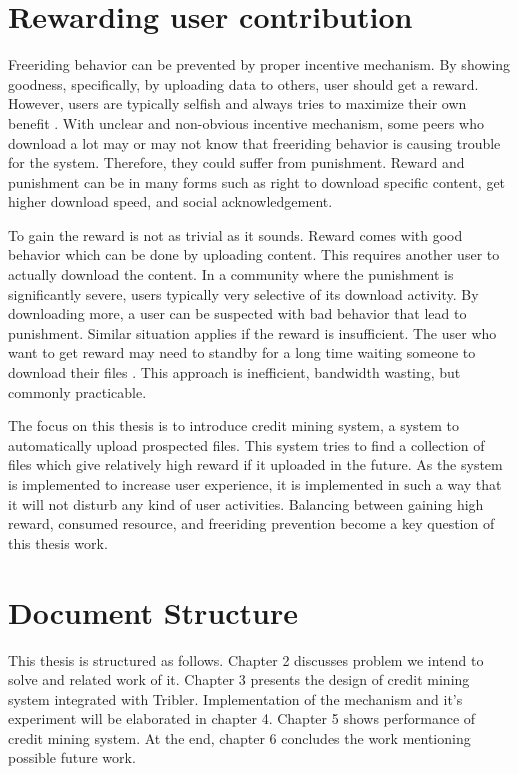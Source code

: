 \section{Rewarding user contribution}
Freeriding behavior can be prevented by proper incentive mechanism. By showing goodness, specifically, by uploading data to others, user should get a reward. However, users are typically selfish and always tries to maximize their own benefit \cite{2015:incentivep2pgame:kang}. With unclear and non-obvious incentive mechanism, some peers who download a lot may or may not know that freeriding behavior is causing trouble for the system. Therefore, they could suffer from punishment. Reward and punishment can be in many forms such as right to download specific content, get higher download speed, and social acknowledgement.

To gain the reward is not as trivial as it sounds. Reward comes with good behavior which can be done by uploading content. This requires another user to actually download the content. In a community where the punishment is significantly severe, users typically very selective of its download activity. By downloading more, a user can be suspected with bad behavior that lead to punishment. Similar situation applies if the reward is insufficient. The user who want to get reward may need to standby for a long time waiting someone to download their files \cite{2013:survivepriv:jia}. This approach is inefficient, bandwidth wasting, but commonly practicable\cite{2013:survivepriv:jia}.

The focus on this thesis is to introduce credit mining system, a system to automatically upload prospected files. This system tries to find a collection of files which give relatively high reward if it uploaded in the future. As the system is implemented to increase user experience, it is implemented in such a way that it will not disturb any kind of user activities. Balancing between gaining high reward, consumed resource, and freeriding prevention become a key question of this thesis work.

\section{Document Structure}
This thesis is structured as follows. Chapter 2 discusses problem we intend to solve and related work of it. Chapter 3 presents the design of credit mining system integrated with Tribler. Implementation of the mechanism and it's experiment will be elaborated in chapter 4. Chapter 5 shows performance of credit mining system. At the end, chapter 6 concludes the work mentioning possible future work.


